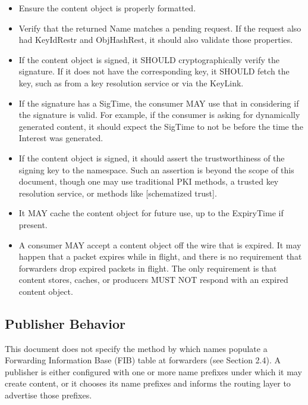 \documentclass[12pt]{report}
\begin{document}
\begin{itemize}
\item Ensure the content object is properly formatted.

\item Verify that the returned Name matches a pending request.  If the
      request also had KeyIdRestr and ObjHashRest, it should also
      validate those properties.

\item If the content object is signed, it SHOULD cryptographically
      verify the signature.  If it does not have the corresponding key,
      it SHOULD fetch the key, such as from a key resolution service or
      via the KeyLink.

\item If the signature has a SigTime, the consumer MAY use that in
      considering if the signature is valid.  For example, if the
      consumer is asking for dynamically generated content, it should
      expect the SigTime to not be before the time the Interest was
      generated.

\item If the content object is signed, it should assert the
      trustworthiness of the signing key to the namespace.  Such an
      assertion is beyond the scope of this document, though one may use
      traditional PKI methods, a trusted key resolution service, or
      methods like [schematized trust].

\item It MAY cache the content object for future use, up to the
      ExpiryTime if present.

\item A consumer MAY accept a content object off the wire that is
      expired.  It may happen that a packet expires while in flight, and
      there is no requirement that forwarders drop expired packets in
      flight.  The only requirement is that content stores, caches, or
      producers MUST NOT respond with an expired content object.
\end{itemize}

\subsection{Publisher Behavior}
This document does not specify the method by which names populate a
Forwarding Information Base (FIB) table at forwarders (see
Section 2.4).  A publisher is either configured with one or more name
prefixes under which it may create content, or it chooses its name
prefixes and informs the routing layer to advertise those prefixes.
\end{document}
